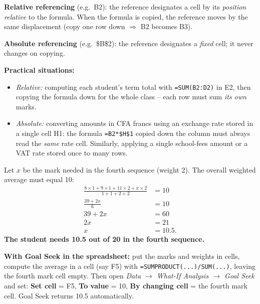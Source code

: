 \documentclass[11pt]{article}
\begin{document}
\begin{corrige}
\textbf{Relative referencing} (e.g.\ B2): the reference designates a cell by its \emph{position relative} to the formula. When the formula is copied, the reference moves by the same displacement (copy one row down $\Rightarrow$ B2 becomes B3).

\textbf{Absolute referencing} (e.g.\ \$B\$2): the reference designates a \emph{fixed} cell; it never changes on copying.

\textbf{Practical situations:}
\begin{itemize}
\item \emph{Relative:} computing each student's term total with \texttt{=SUM(B2:D2)} in E2, then copying the formula down for the whole class -- each row must sum \emph{its own} marks.
\item \emph{Absolute:} converting amounts in CFA francs using an exchange rate stored in a single cell H1: the formula \texttt{=B2*\$H\$1} copied down the column must always read the \emph{same} rate cell. Similarly, applying a single school-fees amount or a VAT rate stored once to many rows.
\end{itemize}
\end{corrige}

\begin{corrige}
Let $x$ be the mark needed in the fourth sequence (weight 2). The overall weighted average must equal 10:
\begin{align*}
\frac{8\times1+9\times1+11\times2+x\times2}{1+1+2+2}&=10 \\
\frac{39+2x}{6}&=10 \\
39+2x&=60 \\
2x&=21 \\
x&=10.5.
\end{align*}
\textbf{The student needs 10.5 out of 20 in the fourth sequence.}

\textbf{With Goal Seek in the spreadsheet:} put the marks and weights in cells, compute the average in a cell (say F5) with \texttt{=SUMPRODUCT(...)/SUM(...)}, leaving the fourth mark cell empty. Then open \emph{Data $\rightarrow$ What-If Analysis $\rightarrow$ Goal Seek} and set: \textbf{Set cell} = F5, \textbf{To value} = 10, \textbf{By changing cell} = the fourth mark cell. Goal Seek returns 10.5 automatically.
\end{corrige}
\end{document}
